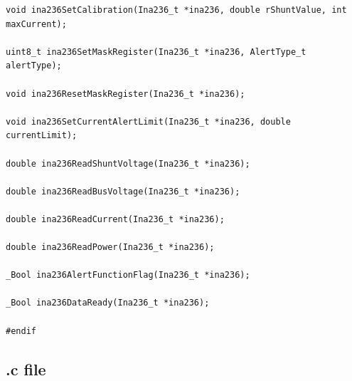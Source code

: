 \documentclass[
10pt, %
a4paper, %
oneside, %
headinclude,footinclude, %
BCOR5mm, %
]{scrartcl}
\begin{document}
\begin{lstlisting}[firstnumber=1,style=CStyle]
void ina236SetCalibration(Ina236_t *ina236, double rShuntValue, int maxCurrent);

uint8_t ina236SetMaskRegister(Ina236_t *ina236, AlertType_t alertType); 

void ina236ResetMaskRegister(Ina236_t *ina236);

void ina236SetCurrentAlertLimit(Ina236_t *ina236, double currentLimit);

double ina236ReadShuntVoltage(Ina236_t *ina236);

double ina236ReadBusVoltage(Ina236_t *ina236);

double ina236ReadCurrent(Ina236_t *ina236);

double ina236ReadPower(Ina236_t *ina236);

_Bool ina236AlertFunctionFlag(Ina236_t *ina236);

_Bool ina236DataReady(Ina236_t *ina236);

#endif

\end{lstlisting}

\subsection{.c file}
\end{document}
